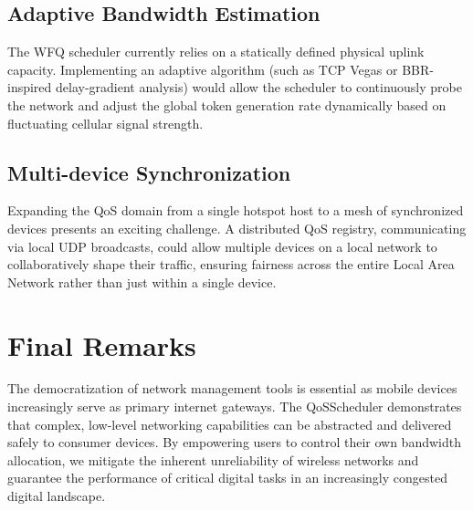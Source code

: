 \subsection{Adaptive Bandwidth Estimation}
The WFQ scheduler currently relies on a statically defined physical uplink capacity. Implementing an adaptive algorithm (such as TCP Vegas or BBR-inspired delay-gradient analysis) would allow the scheduler to continuously probe the network and adjust the global token generation rate dynamically based on fluctuating cellular signal strength.

\subsection{Multi-device Synchronization}
Expanding the QoS domain from a single hotspot host to a mesh of synchronized devices presents an exciting challenge. A distributed QoS registry, communicating via local UDP broadcasts, could allow multiple devices on a local network to collaboratively shape their traffic, ensuring fairness across the entire Local Area Network rather than just within a single device.

\section{Final Remarks}
\label{sec:final_remarks}

The democratization of network management tools is essential as mobile devices increasingly serve as primary internet gateways. The QoSScheduler demonstrates that complex, low-level networking capabilities can be abstracted and delivered safely to consumer devices. By empowering users to control their own bandwidth allocation, we mitigate the inherent unreliability of wireless networks and guarantee the performance of critical digital tasks in an increasingly congested digital landscape.
